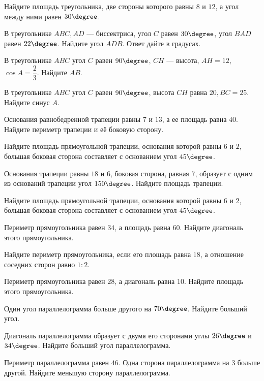 \begin{class}[number=8]
	\begin{listofex}
		\item Найдите площадь треугольника, две стороны которого равны \(8\) и \(12\), а угол между ними равен \(30 \degree \).
		\item В треугольнике \(ABC, AD\)  --- биссектриса, угол \(C\) равен \(30 \degree\), угол \(BAD\) равен \(22 \degree\). Найдите угол \(ADB\). Ответ дайте в градусах.
		\item В треугольнике \(ABC\) угол \(C\) равен \(90 \degree \), \(CH\)  --- высота, \(AH = 12\),  \(\cos A = \dfrac{2}{3} \).  Найдите \(AB\).
		\item В треугольнике \(ABC\) угол \(C\) равен \(90 \degree \), высота \(CH\) равна \(20, BC  =  25\). Найдите  синус \(A\).
		\item Основания равнобедренной трапеции равны \(7\) и \(13\), а ее площадь равна \(40\). Найдите периметр трапеции и её боковую сторону.
		\item Найдите площадь прямоугольной трапеции, основания которой равны \(6\) и \(2\), большая боковая сторона составляет с основанием угол \(45 \degree\).
		\item Основания трапеции равны \(18\) и \(6\), боковая сторона, равная \(7\), образует с одним из оснований трапеции угол \(150 \degree \). Найдите площадь трапеции.
		\item Найдите площадь прямоугольной трапеции, основания которой равны \(6\) и \(2\), большая боковая сторона составляет с основанием угол \(45 \degree \).
		
		\item Периметр прямоугольника равен \(34\), а площадь равна \(60\). Найдите диагональ этого прямоугольника.
		\item Найдите периметр прямоугольника, если его площадь равна \(18\), а отношение соседних сторон равно \(1:2\).
		\item Периметр прямоугольника равен \(28\), а диагональ равна \(10\). Найдите площадь этого прямоугольника.
		\item Один угол параллелограмма больше другого на \(70 \degree \). Найдите больший угол.
		\item Диагональ параллелограмма образует с двумя его сторонами углы \(26\degree\) и \(34\degree \). Найдите больший угол параллелограмма.
		\item Периметр параллелограмма равен \(46\). Одна сторона параллелограмма на \(3\) больше другой. Найдите меньшую сторону параллелограмма.
		

\end{listofex}
\end{class}
